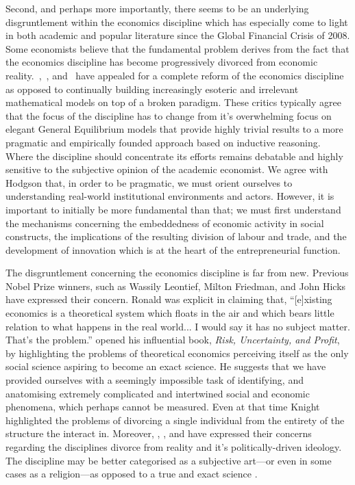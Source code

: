 Second, and perhaps more importantly, there seems to be an underlying disgruntlement within the economics discipline which has especially come to light in both academic and popular literature since the Global Financial Crisis of 2008. Some economists believe that the fundamental problem derives from the fact that the economics discipline has become progressively divorced from economic reality.~\citet{Hodgson2009},~\citet{Smith2010}, and~\citet{Keen2011} have appealed for a complete reform of the economics discipline as opposed to continually building increasingly esoteric and irrelevant mathematical models on top of a broken paradigm. These critics typically agree that the focus of the discipline has to change from it's overwhelming focus on elegant General Equilibrium models that provide highly trivial results to a more pragmatic and empirically founded approach based on inductive reasoning. Where the discipline should concentrate its efforts remains debatable and highly sensitive to the subjective opinion of the academic economist. We agree with Hodgson that, in order to be pragmatic, we must orient ourselves to understanding real-world institutional environments and actors. However, it is important to initially be more fundamental than that; we must first understand the mechanisms concerning the embeddedness of economic activity in social constructs, the implications of the resulting division of labour and trade, and the development of innovation which is at the heart of the entrepreneurial function.

The disgruntlement concerning the economics discipline is far from new. Previous Nobel Prize winners, such as Wassily Leontief, Milton Friedman, and John Hicks have expressed their concern. Ronald \citet{Coase1997} was explicit in claiming that, ``[e]xisting economics is a theoretical system which floats in the air and which bears little relation to what happens in the real world... I would say it has no subject matter. That's the problem.'' \citet{Knight1921} opened his influential book, \textit{Risk, Uncertainty, and Profit}, by highlighting the problems of theoretical economics perceiving itself as the only social science aspiring to become an exact science. He suggests that we have provided ourselves with a seemingly impossible task of identifying, and anatomising extremely complicated and intertwined social and economic phenomena, which perhaps cannot be measured. Even at that time Knight highlighted the problems of divorcing a single individual from the entirety of the structure the interact in. Moreover, \citet{Krugman2009}, \citet{Stiglitz2010}, and \citet{Varoufakis2011} have expressed their concerns regarding the disciplines divorce from reality and it's politically-driven ideology. The discipline may be better categorised as a subjective art---or even in some cases as a religion---as opposed to a true and exact science \citep{Backhouse2010}.

